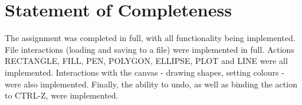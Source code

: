 \section{Statement of Completeness}

The assignment was completed in full, with all functionality being implemented.
File interactions (loading and saving to a file) were implemented in full.
Actions RECTANGLE, FILL, PEN, POLYGON, ELLIPSE, PLOT and LINE were all implemented.
Interactions with the canvas - drawing shapes, setting colours - were also implemented.
Finally, the ability to undo, as well as binding the action to CTRL-Z, were implemented.
